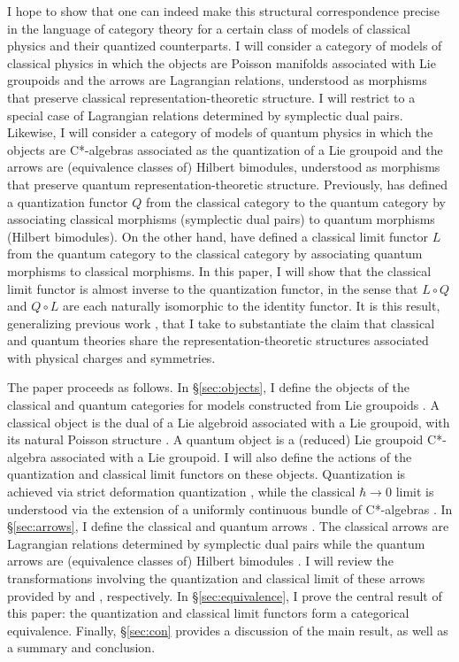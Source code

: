 \documentclass[sn-mathphys,Numbered]{sn-jnl}
\begin{document}
I hope to show that one can indeed make this structural correspondence precise in the language of category theory for a certain class of models of classical physics and their quantized counterparts.  I will consider a category of models of classical physics in which the objects are Poisson manifolds associated with Lie groupoids and the arrows are Lagrangian relations, understood as morphisms that preserve classical representation-theoretic structure.  I will restrict to a special case of Lagrangian relations determined by symplectic dual pairs.  Likewise, I will consider a category of models of quantum physics in which the objects are C*-algebras associated as the quantization of a Lie groupoid and the arrows are (equivalence classes of) Hilbert bimodules, understood as morphisms that preserve quantum representation-theoretic structure.  Previously, \citet{La02a} has defined a quantization functor $Q$ from the classical category to the quantum category by associating classical morphisms (symplectic dual pairs) to quantum morphisms (Hilbert bimodules).  On the other hand, \citet{FeSt24} have defined a classical limit functor $L$ from the quantum category to the classical category by associating quantum morphisms to classical morphisms.  In this paper, I will show that the classical limit functor is almost inverse to the quantization functor, in the sense that $L\circ Q$ and $Q\circ L$ are each naturally isomorphic to the identity functor.  It is this result, generalizing previous work \citep{Fe24}, that I take to substantiate the claim that classical and quantum theories share the representation-theoretic structures associated with physical charges and symmetries.

The paper proceeds as follows.  In \S\ref{sec:objects}, I define the objects of the classical and quantum categories for models constructed from Lie groupoids \citep{Ma87,La98b}.  A classical object is the dual of a Lie algebroid associated with a Lie groupoid, with its natural Poisson structure \citep{La01a,We00,CrFe04}. A quantum object is a (reduced) Lie groupoid C*-algebra \citep{La98b,La01a} associated with a Lie groupoid.  I will also define the actions of the quantization and classical limit functors on these objects.  Quantization is achieved via strict deformation quantization \citep{Ri89,Ri93,La98b,La99}, while the classical $\hbar\to 0$ limit is understood via the extension of a uniformly continuous bundle of C*-algebras \citep{KiWa95,StFe21a,StFe21}.  In \S\ref{sec:arrows}, I define the classical and quantum arrows \citep{La01b,La01c}.  The classical arrows are Lagrangian relations determined by symplectic dual pairs \citep{We83,Xu91,Xu92,BuWe04,We10} while the quantum arrows are (equivalence classes of) Hilbert bimodules \citep{La95,RaWi98}.  I will review the transformations involving the quantization and classical limit of these arrows provided by \citet{La02a} and \citet{FeSt24}, respectively.  In \S\ref{sec:equivalence}, I prove the central result of this paper: the quantization and classical limit functors form a categorical equivalence.  Finally, \S\ref{sec:con} provides a discussion of the main result, as well as a summary and conclusion.
\end{document}
